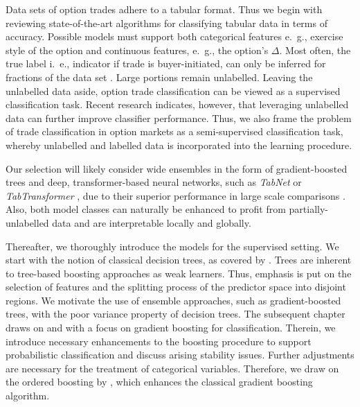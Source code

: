 Data sets of option trades adhere to a tabular format.  Thus we begin with reviewing state-of-the-art algorithms for classifying tabular data in terms of accuracy. Possible models must support both categorical features e.~g., exercise style of the option and continuous features, e.~g., the option's $\Delta$. Most often, the true label i.~e., indicator if trade is buyer-initiated, can only be inferred for fractions of the data set \autocites{grauerOptionTradeClassification2022}{savickasInferringDirectionOption2003}. Large portions remain unlabelled. Leaving the unlabelled data aside, option trade classification can be viewed as a supervised classification task. Recent research \autocites{arikTabNetAttentiveInterpretable2020}{huangTabTransformerTabularData2020}{yoonVIMEExtendingSuccess2020} indicates, however, that leveraging unlabelled data can further improve classifier performance. Thus, we also frame the problem of trade classification in option markets as a semi-supervised classification task, whereby unlabelled and labelled data is incorporated into the learning procedure. 

Our selection will likely consider wide ensembles in the form of gradient-boosted trees and deep, transformer-based neural networks, such as \textit{TabNet} \autocite{arikTabNetAttentiveInterpretable2020} or \textit{TabTransformer} \autocite{huangTabTransformerTabularData2020}, due to their superior performance in large scale comparisons \autocites{borisovDeepNeuralNetworks2022}{gorishniyRevisitingDeepLearning2021}{grinsztajnWhyTreebasedModels2022}{shwartz-zivTabularDataDeep2021}. Also, both model classes can naturally be enhanced to profit from partially-unlabelled data and are interpretable locally and globally. 

Thereafter, we thoroughly introduce the models for the supervised setting. We start with the notion of classical decision trees, as covered by \textcite{breimanClassificationRegressionTrees2017}. Trees are inherent to tree-based boosting approaches as weak learners. Thus, emphasis is put on the selection of features and the splitting process of the predictor space into disjoint regions. We motivate the use of ensemble approaches, such as gradient-boosted trees, with the poor variance property of decision trees. The subsequent chapter draws on \textcite{hastietrevorElementsStatisticalLearning2009} and \textcite{friedmanGreedyFunctionApproximation2001} with a focus on gradient boosting for classification. Therein, we introduce necessary enhancements to the boosting procedure to support probabilistic classification and discuss arising stability issues. Further adjustments are necessary for the treatment of categorical variables. Therefore, we draw on the ordered boosting by \textcite{prokhorenkovaCatBoostUnbiasedBoosting2018}, which enhances the classical gradient boosting algorithm.

